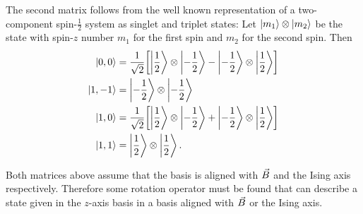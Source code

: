 \documentclass[a4paper]{article}
\begin{document}
The second matrix follows from the well known representation of a two-component
spin-\(\frac{1}{2}\) system as singlet and triplet states: Let \(\ket{m_1}\otimes \ket{m_2}\) be the
state with spin-\(z\) number \(m_1\) for the first spin and \(m_2\) for the second
spin. Then
\begin{align*}
    \ket{0, 0} &= \frac{1}{\sqrt{2}}\bqty{\ket{\frac{1}{2}}\otimes\ket{-\frac{1}{2}} -
                \ket{-\frac{1}{2}}\otimes\ket{\frac{1}{2}}}\\
    \ket{1, -1} &= \ket{-\frac{1}{2}}\otimes\ket{-{\frac{1}{2}}}\\
    \ket{1, 0} &= \frac{1}{\sqrt{2} }\bqty{\ket{\frac{1}{2}}\otimes\ket{-\frac{1}{2}} +
            \ket{-\frac{1}{2}}\otimes\ket{\frac{1}{2}}}\\
    \ket{1, 1} &= \ket{\frac{1}{2}}\otimes\ket{\frac{1}{2}}
.\end{align*}

Both matrices above assume that the basis is aligned with \(\vec{B}\) and the Ising axis
respectively. Therefore some rotation operator must be found that can describe a state
given in the \(z\)-axis basis in a basis aligned with \(\vec{B}\) or the Ising axis.
\end{document}
